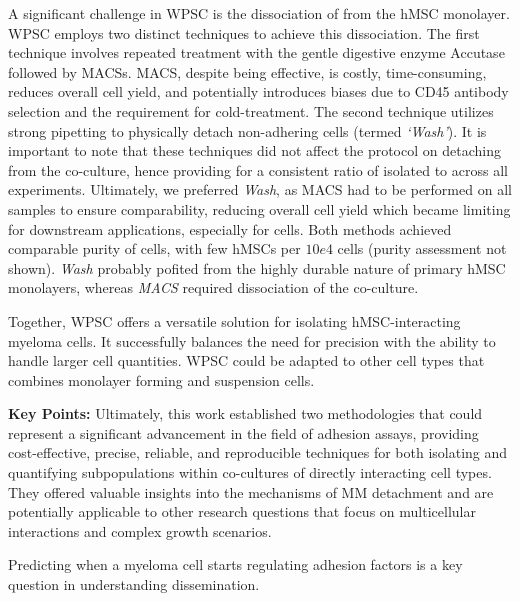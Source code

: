 A significant challenge in \ac{WPSC} is the dissociation of \MAina from the hMSC
monolayer. WPSC employs two distinct techniques to achieve this dissociation.
The first technique involves repeated treatment with the gentle digestive enzyme
Accutase followed by \acp{MACS}. \ac{MACS}, despite being effective, is costly,
time-consuming, reduces overall cell yield, and potentially introduces biases
due to CD45 antibody selection and the requirement for cold-treatment. The
second technique utilizes strong pipetting to physically detach non-adhering
cells (termed \emph{`Wash'}). It is important to note that these techniques did
not affect the protocol on detaching \nMAina from the co-culture, hence
providing for a consistent ratio of isolated \MAina to \nMAina across all
experiments. Ultimately, we preferred \emph{Wash}, as \ac{MACS} had to be performed
on all samples to ensure comparability, reducing overall cell yield which became
limiting for downstream applications, especially for \nMAina cells. Both methods
achieved comparable purity of \MAina cells, with few hMSCs per $10e4$
\MAina cells (purity assessment not shown). \emph{Wash} probably pofited from
the highly durable nature of primary hMSC monolayers, whereas \emph{MACS}
required dissociation of the co-culture.

Together, \ac{WPSC} offers a versatile solution for isolating hMSC-interacting
myeloma cells. It successfully balances the need for precision with the ability
to handle larger cell quantities. \ac{WPSC} could be adapted to other cell types
that combines monolayer forming and suspension cells.



\textbf{Key Points:} Ultimately, this work established two methodologies
that could represent a significant advancement in the field of adhesion assays,
providing cost-effective, precise, reliable, and reproducible techniques for
both isolating and quantifying subpopulations within co-cultures of directly
interacting cell types. They offered valuable insights into the mechanisms of MM
detachment and are potentially applicable to other research questions that focus
on multicellular interactions and complex growth scenarios.


%
\label{sec:discussion_order_adhesion}%


Predicting when a myeloma cell starts regulating adhesion factors is a key
question in understanding dissemination.

